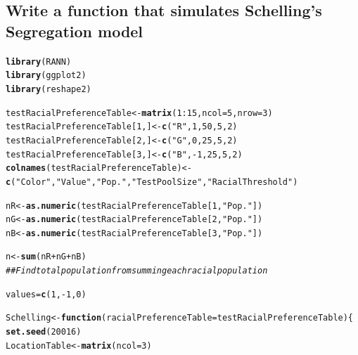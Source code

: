 \documentclass{article}\usepackage[]{graphicx}\usepackage[]{color}
\makeatletter
\newcommand{\hlnum}[1]{\textcolor[rgb]{0.686,0.059,0.569}{#1}}%
\newcommand{\hlstr}[1]{\textcolor[rgb]{0.192,0.494,0.8}{#1}}%
\newcommand{\hlcom}[1]{\textcolor[rgb]{0.678,0.584,0.686}{\textit{#1}}}%
\newcommand{\hlopt}[1]{\textcolor[rgb]{0,0,0}{#1}}%
\newcommand{\hlstd}[1]{\textcolor[rgb]{0.345,0.345,0.345}{#1}}%
\newcommand{\hlkwa}[1]{\textcolor[rgb]{0.161,0.373,0.58}{\textbf{#1}}}%
\newcommand{\hlkwb}[1]{\textcolor[rgb]{0.69,0.353,0.396}{#1}}%
\newcommand{\hlkwc}[1]{\textcolor[rgb]{0.333,0.667,0.333}{#1}}%
\newcommand{\hlkwd}[1]{\textcolor[rgb]{0.737,0.353,0.396}{\textbf{#1}}}%
\newenvironment{kframe}{%
 \def\at@end@of@kframe{}%
 \ifinner\ifhmode%
  \def\at@end@of@kframe{\end{minipage}}%
  \begin{minipage}{\columnwidth}%
 \fi\fi%
 \def\FrameCommand##1{\hskip\@totalleftmargin \hskip-\fboxsep
 \colorbox{shadecolor}{##1}\hskip-\fboxsep
     \hskip-\linewidth \hskip-\@totalleftmargin \hskip\columnwidth}%
 \MakeFramed {\advance\hsize-\width
   \@totalleftmargin\z@ \linewidth\hsize
   \@setminipage}}%
 {\par\unskip\endMakeFramed%
 \at@end@of@kframe}
\newenvironment{knitrout}{}{} %
\makeatother
\begin{document}
\subsection{Write a function that simulates Schelling's Segregation model}
\begin{knitrout}
\color{fgcolor}\begin{kframe}
\begin{alltt}
\hlkwd{library}\hlstd{(RANN)}
\hlkwd{library}\hlstd{(ggplot2)}
\hlkwd{library}\hlstd{(reshape2)}

\hlstd{testRacialPreferenceTable} \hlkwb{<-} \hlkwd{matrix}\hlstd{(}\hlnum{1}\hlopt{:}\hlnum{15}\hlstd{,} \hlkwc{ncol} \hlstd{=} \hlnum{5}\hlstd{,} \hlkwc{nrow} \hlstd{=} \hlnum{3}\hlstd{)}
\hlstd{testRacialPreferenceTable[}\hlnum{1}\hlstd{,]} \hlkwb{<-} \hlkwd{c}\hlstd{(}\hlstr{"R"}\hlstd{,}\hlnum{1}\hlstd{,} \hlnum{50}\hlstd{,} \hlnum{5}\hlstd{,} \hlnum{2}\hlstd{)}
\hlstd{testRacialPreferenceTable[}\hlnum{2}\hlstd{,]} \hlkwb{<-} \hlkwd{c}\hlstd{(}\hlstr{"G"}\hlstd{,} \hlnum{0}\hlstd{,} \hlnum{25}\hlstd{,} \hlnum{5}\hlstd{,} \hlnum{2}\hlstd{)}
\hlstd{testRacialPreferenceTable[}\hlnum{3}\hlstd{,]} \hlkwb{<-} \hlkwd{c}\hlstd{(}\hlstr{"B"}\hlstd{,} \hlopt{-}\hlnum{1}\hlstd{,} \hlnum{25}\hlstd{,} \hlnum{5}\hlstd{,} \hlnum{2}\hlstd{)}
\hlkwd{colnames}\hlstd{(testRacialPreferenceTable)} \hlkwb{<-} \hlkwd{c}\hlstd{(}\hlstr{"Color"}\hlstd{,} \hlstr{"Value"}\hlstd{,} \hlstr{"Pop."}\hlstd{,} \hlstr{"Test Pool Size"}\hlstd{,} \hlstr{"Racial Threshold"}\hlstd{)}

\hlstd{nR} \hlkwb{<-} \hlkwd{as.numeric}\hlstd{(testRacialPreferenceTable[}\hlnum{1}\hlstd{,}\hlstr{"Pop."}\hlstd{])}
\hlstd{nG} \hlkwb{<-} \hlkwd{as.numeric}\hlstd{(testRacialPreferenceTable[}\hlnum{2}\hlstd{,}\hlstr{"Pop."}\hlstd{])}
\hlstd{nB} \hlkwb{<-} \hlkwd{as.numeric}\hlstd{(testRacialPreferenceTable[}\hlnum{3}\hlstd{,}\hlstr{"Pop."}\hlstd{])}

\hlstd{n} \hlkwb{<-} \hlkwd{sum}\hlstd{(nR} \hlopt{+} \hlstd{nG} \hlopt{+} \hlstd{nB)}
\hlcom{## Find total population from summing each racial population}

\hlstd{values} \hlkwb{=} \hlkwd{c}\hlstd{(}\hlnum{1}\hlstd{,}\hlopt{-}\hlnum{1}\hlstd{,}\hlnum{0}\hlstd{)}

\hlstd{Schelling} \hlkwb{<-} \hlkwa{function}\hlstd{(}\hlkwc{racialPreferenceTable} \hlstd{= testRacialPreferenceTable)\{}
  \hlkwd{set.seed}\hlstd{(}\hlnum{20016}\hlstd{)}
  \hlstd{LocationTable} \hlkwb{<-} \hlkwd{matrix}\hlstd{(}\hlkwc{ncol} \hlstd{=} \hlnum{3}\hlstd{)}


\end{alltt}
\end{kframe}
\end{knitrout}
\end{document}
